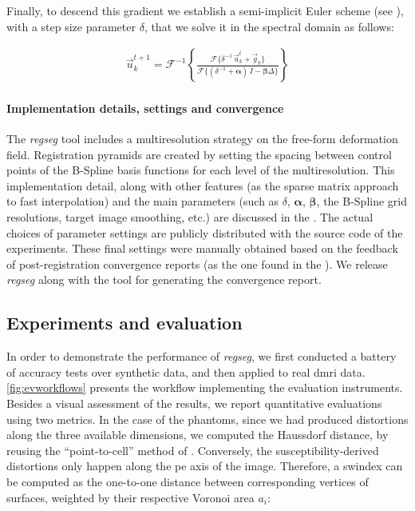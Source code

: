 Finally, to descend this gradient we establish a semi-implicit Euler scheme (see ),
  with a step size parameter $\delta$, that we solve it in the spectral domain as follows:

  \begin{align}
  \vec{u}_k^{t+1} = \mathcal{F}^{-1}\left\{ \frac{\mathcal{F}\{\delta^{-1} \, \vec{u}_k^t + \vec{g}_k\} }%
                  {\mathcal{F}\{(\delta^{-1} + \boldsymbol{\alpha})\, I - \boldsymbol{\beta}\Delta\}} \right\}
  \label{eq:update_equation}
  \end{align}


\paragraph*{Implementation details, settings and convergence}
\label{sec:conv_report}
The \emph{regseg} tool includes a multiresolution strategy on the free-form deformation field.
Registration pyramids are created by setting the spacing between control points of the B-Spline basis
  functions for each level of the multiresolution.
This implementation detail, along with other features (as the sparse matrix approach
  to fast interpolation) and the main parameters 
  (such as $\delta$, $\boldsymbol{\alpha}$, $\boldsymbol{\beta}$, the B-Spline grid resolutions,
  target image smoothing, etc.) are discussed in the .
The actual choices of parameter settings are publicly distributed with the source code of the experiments.
These final settings were manually obtained based on the feedback of post-registration convergence
  reports (as the one found in the ).
We release \emph{regseg} along with the tool for generating the convergence report.


\subsection{Experiments and evaluation}
\label{sec:experiments_evaluation}
%
In order to demonstrate the performance of \emph{regseg}, we first conducted a battery of
  accuracy tests over synthetic data, and then applied to real \gls*{dmri} data.
\autoref{fig:evworkflows} presents the workflow implementing the evaluation instruments.
Besides a visual assessment of the results, we report quantitative evaluations using
  two metrics.
In the case of the phantoms, since we had produced distortions along the three
  available dimensions, we computed the Haussdorf distance, by reusing the
  ``point-to-cell'' method of \cite{commandeur_vtk_2011}.
Conversely, the susceptibility-derived distortions only happen along the \gls*{pe}
  axis of the image.
Therefore, a \gls*{swindex} can be computed as the one-to-one distance between corresponding
  vertices of surfaces, weighted by their respective Voronoi area $a_i$:

